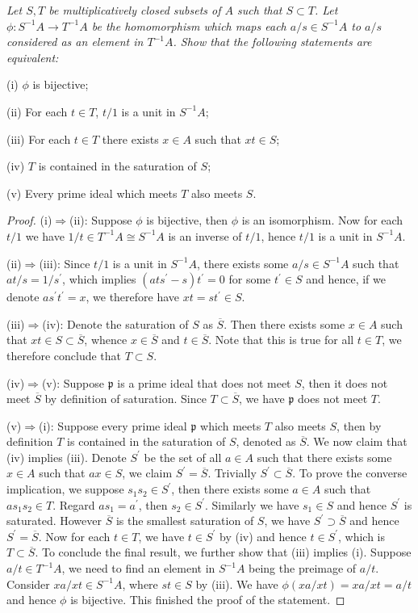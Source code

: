 \begin{problem}\em
Let $S,T$ be multiplicatively closed subsets of $A$ such that $S\subset T$. Let $\phi:S^{-1}A\to T^{-1}A$ be the homomorphism which maps each $a/s\in S^{-1}A$ to $a/s$ considered as an element in $T^{-1}A$. Show that the following statements are equivalent:\par
(i) $\phi$ is bijective;\par
(ii) For each $t\in T$, $t/1$ is a unit in $S^{-1}A$;\par
(iii) For each $t\in T$ there exists $x\in A$ such that $xt\in S$;\par
(iv) $T$ is contained in the saturation of $S$;\par
(v) Every prime ideal which meets $T$ also meets $S$.
\end{problem}
\begin{proof}
(i)$\Rightarrow$(ii): Suppose $\phi$ is bijective, then $\phi$ is an isomorphism. Now for each $t/1$ we have $1/t\in T^{-1}A\cong S^{-1}A$ is an inverse of $t/1$, hence $t/1$ is a unit in $S^{-1}A$.\par
(ii)$\Rightarrow$(iii): Since $t/1$ is a unit in $S^{-1}A$, there exists some $a/s\in S^{-1}A$ such that $at/s=1/s^\prime$, which implies $(ats^\prime-s)t^\prime=0$ for some $t^\prime\in S$ and hence, if we denote $as^\prime t^\prime=x$, we therefore have $xt=st^\prime\in S$.\par
(iii)$\Rightarrow$(iv): Denote the saturation of $S$ as $\overline{S}$. Then there exists some $x\in A$ such that $xt\in S\subset\overline{S}$, whence $x\in\overline{S}$ and $t\in\overline{S}$. Note that this is true for all $t\in T$, we therefore conclude that $T\subset S$.\par
(iv)$\Rightarrow$(v): Suppose $\mathfrak{p}$ is a prime ideal that does not meet $S$, then it does not meet $\overline{S}$ by definition of saturation. Since $T\subset\overline{S}$, we have $\mathfrak{p}$ does not meet $T$.\par
(v)$\Rightarrow$(i): Suppose every prime ideal $\mathfrak{p}$ which meets $T$ also meets $S$, then by definition $T$ is contained in the saturation of $S$, denoted as $\overline{S}$. We now claim that (iv) implies (iii). Denote $S^\prime$ be the set of all $a\in A$ such that there exists some $x\in A$ such that $ax\in S$, we claim $S^\prime=\overline{S}$. Trivially $S^\prime\subset\overline{S}$. To prove the converse implication, we suppose $s_1s_2\in S^\prime$, then there exists some $a\in A$ such that $as_1s_2\in T$. Regard $as_1=a^\prime$, then $s_2\in S^\prime$. Similarly we have $s_1\in S$ and hence $S^\prime$ is saturated. However $\overline{S}$ is the smallest saturation of $S$, we have $S^\prime\supset\overline{S}$ and hence $S^\prime=\overline{S}$. Now for each $t\in T$, we have $t\in S^\prime$ by (iv) and hence $t\in S^\prime$, which is $T\subset\overline{S}$. To conclude the final result, we further show that (iii) implies (i). Suppose $a/t\in T^{-1}A$, we need to find an element in $S^{-1}A$ being the preimage of $a/t$. Consider $xa/xt\in S^{-1}A$, where $st\in S$ by (iii). We have $\phi(xa/xt)=xa/xt=a/t$ and hence $\phi$ is bijective. This finished the proof of the statement.
\end{proof}
